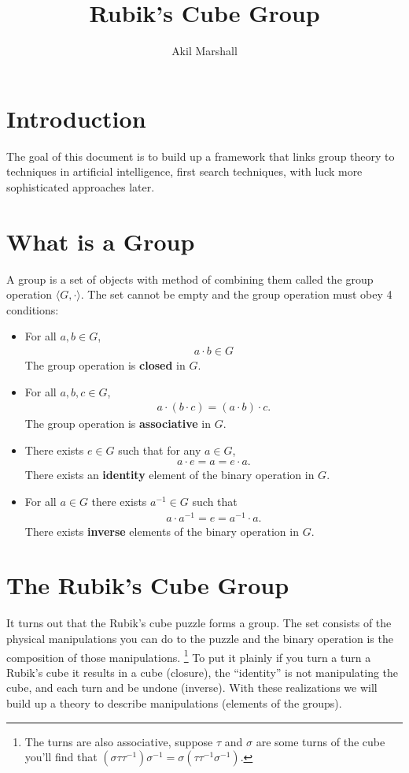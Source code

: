\documentclass{article}
\title{Rubik's Cube Group}
\author{Akil Marshall}
\begin{document}
\maketitle
\section{Introduction}
The goal of this document is to build up a framework that links group theory to techniques in artificial intelligence, first search techniques, with luck more sophisticated approaches later.

\section{What is a Group}
A group is a set of objects with method of combining them called the group operation $\langle G,\cdot\rangle$. The set cannot be empty and the group operation must obey 4 conditions:
\begin{itemize}
    \item For all $a,b\in G$,
        \begin{align*}
            a\cdot b\in G
        \end{align*}
        The group operation is \textbf{closed} in $G$.
    \item For all $a,b,c\in G$,
        \begin{align*}
            a\cdot(b\cdot c)=(a\cdot b)\cdot c.
        \end{align*}
        The group operation is \textbf{associative} in $G$.
    \item There exists $e\in G$ such that for any $a\in G$,
        \begin{align*}
            a\cdot e=a=e\cdot a.
        \end{align*}
        There exists an \textbf{identity} element of the binary operation in $G$.
    \item For all $a\in G$ there exists  $a^{-1}\in G$ such that
        \begin{align*}
            a\cdot a^{-1}=e=a^{-1}\cdot a.
        \end{align*}
        There exists \textbf{inverse} elements of the binary operation in $G$.
\end{itemize}
\section{The Rubik's Cube Group}
It turns out that the Rubik's cube puzzle forms a group.
The set consists of the physical manipulations you can do to the puzzle and the binary operation is the composition of those manipulations.
\footnote{The turns are also associative, suppose $\tau$ and $\sigma$ are some turns of the cube you'll find that $(\sigma\tau\tau^{-1})\sigma^{-1}=\sigma(\tau\tau^{-1}\sigma^{-1})$.}
To put it plainly if you turn a turn a Rubik's cube it results in a cube (closure), the ``identity'' is not manipulating the cube, and each turn and be undone (inverse). With these realizations we will build up a theory to describe manipulations (elements of the groups).
\end{document}
